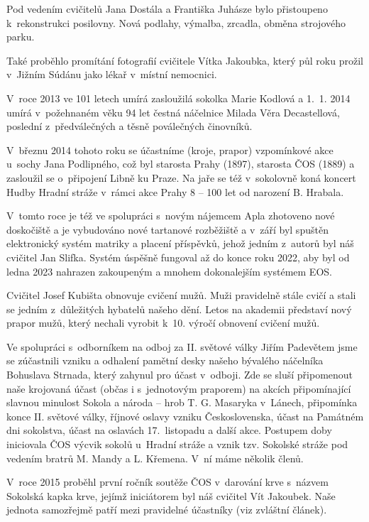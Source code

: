 \documentclass[a5paper, 11pt, twoside]{article}
\begin{document}
Pod vedením cvičitelů Jana Dostála a Františka Juhásze bylo přistoupeno
k~rekonstrukci posilovny. Nová podlahy, výmalba, zrcadla, obměna
strojového parku.

Také proběhlo promítání fotografií cvičitele Vítka Jakoubka, který půl
roku prožil v~Jižním Súdánu jako lékař v~místní nemocnici.

V~roce 2013 ve 101 letech umírá zasloužilá sokolka Marie Kodlová a 1.~1.
2014 umírá v~požehnaném věku 94 let čestná náčelnice Milada Věra
Decastellová, poslední z~předválečných a těsně poválečných činovníků.

V~březnu 2014 tohoto roku se účastníme (kroje, prapor) vzpomínkové akce
u~sochy Jana Podlipného, což byl starosta Prahy (1897), starosta ČOS
(1889) a zasloužil se o~připojení Libně ku Praze. Na jaře se též
v~sokolovně koná koncert Hudby Hradní stráže v~rámci akce Prahy 8 -- 100
let od narození B. Hrabala.

V~tomto roce je též ve spolupráci s~novým nájemcem Apla zhotoveno nové
doskočiště a je vybudováno nové tartanové rozběžiště a v~září byl
spuštěn elektronický systém matriky a placení příspěvků, jehož jedním
z~autorů byl náš cvičitel Jan Slifka. Systém úspěšně fungoval až do konce
roku 2022, aby byl od ledna 2023 nahrazen zakoupeným a mnohem
dokonalejším systémem EOS.

Cvičitel Josef Kubišta obnovuje cvičení mužů. Muži pravidelně stále
cvičí a stali se jedním z~důležitých hybatelů našeho dění. Letos na
akademii představí nový prapor mužů, který nechali vyrobit k~10. výročí
obnovení cvičení mužů.

Ve spolupráci s~odborníkem na odboj za II. světové války Jiřím Padevětem
jsme se zúčastnili vzniku a odhalení pamětní desky našeho bývalého
náčelníka Bohuslava Strnada, který zahynul pro účast v~odboji. Zde se
sluší připomenout naše krojovaná účast (občas i s~jednotovým praporem)
na akcích připomínající slavnou minulost Sokola a národa -- hrob T. G.
Masaryka v~Lánech, připomínka konce II. světové války, říjnové oslavy
vzniku Československa, účast na Památném dni sokolstva, účast na
oslavách 17.~listopadu a další akce. Postupem doby iniciovala ČOS výcvik
sokolů u~Hradní stráže a vznik tzv. Sokolské stráže pod vedením bratrů
M. Mandy a L. Křemena. V~ní máme několik členů.

V~roce 2015 proběhl první ročník soutěže ČOS v~darování krve s~názvem
Sokolská kapka krve, jejímž iniciátorem byl náš cvičitel Vít Jakoubek.
Naše jednota samozřejmě patří mezi pravidelné účastníky (viz zvláštní
článek).
\end{document}
